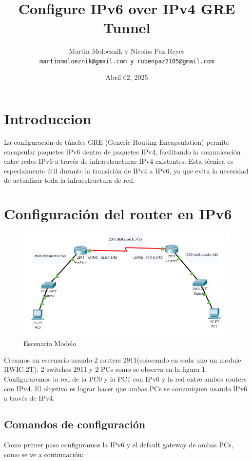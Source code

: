 \documentclass[a4paper,12pt]{article}
\title{Configure IPv6 over IPv4 GRE Tunnel}
\author{Martin Moloeznik y Nicolas Paz Reyes\\ \texttt{martinmoloeznik@gmail.com y rubenpaz2105@gmail.com}}
\date{Abril 02, 2025}
\begin{document}
\maketitle

\section{Introduccion}
La configuración de túneles GRE (Generic Routing Encapsulation) permite encapsular paquetes IPv6 dentro de paquetes IPv4, facilitando la comunicación entre redes IPv6 a través de infraestructuras IPv4 existentes. Esta técnica es especialmente útil durante la transición de IPv4 a IPv6, ya que evita la necesidad de actualizar toda la infraestructura de red.
\section{Configuración del router en IPv6}
\begin{figure}[h]
    \centering
    \includegraphics[width=1\textwidth]{imagenes/lab1.png}
    \caption{Escenario Modelo}
  \end{figure}
\FloatBarrier

Creamos un escenario usando 2 routers 2911(colocando en cada uno un module HWIC-2T), 2 switches 2911 y 2 PCs como se observa en la figura 1. Configuraremos la red de la PC0 y la PC1 con IPv6 y la red entre ambos routers con IPv4. El objetivo es lograr hacer que ambas PCs se comuniquen usando IPv6 a través de IPv4.\\
\subsection{Comandos de configuración}

Como primer paso configuramos la IPv6 y el default gateway de ambas PCs, como se ve a continuación:\\
\end{document}
